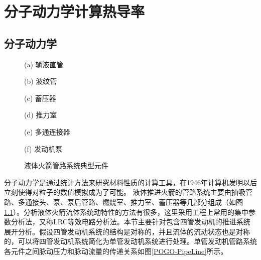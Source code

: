 
\chapter{分子动力学计算热导率}

\section{分子动力学}
\label{sec:Lumped-Feedline-Model}
\begin{figure}[!htb]
  \centering
  \begin{minipage}[b]{0.3\textwidth}
    \centering
    \caption*{(a) 输液直管}
  \end{minipage}
  \centering
  \begin{minipage}[b]{0.3\textwidth}
    \centering
    \caption*{(b) 波纹管}
  \end{minipage}
  \centering
  \begin{minipage}[b]{0.3\textwidth}
    \centering
    \caption*{(c) 蓄压器}
  \end{minipage}
  \centering
  \begin{minipage}[b]{0.3\textwidth}
    \centering
    \caption*{(d) 推力室}
  \end{minipage}
  \centering
  \begin{minipage}[b]{0.3\textwidth}
    \centering
    \caption*{(e) 多通连接器}
  \end{minipage}
  \centering
  \begin{minipage}[b]{0.3\textwidth}
    \centering
    \caption*{(f) 发动机泵}
  \end{minipage}
  \caption{液体火箭管路系统典型元件}
  \label{FeedLine-TypicalElement}
\end{figure}

分子动力学是通过统计方法来研究材料性质的计算工具，在1946年计算机发明以后立刻使得对粒子的数值模拟成为了可能。
液体推进火箭的管路系统主要由抽吸管路、多通接头、泵、泵后管路、燃烧室、推力室、蓄压器等几部分组成（如图\ref{FeedLine-TypicalElement}）。分析液体火箭流体系统动特性的方法有很多，这里采用工程上常用的集中参数分析法，又称LRC等效电路分析法\cite{Dimaggio:1972, Vaage:1972, YangMing:2010}。本节主要针对包含四管发动机的推进系统展开分析。假设四管发动机系统的结构是对称的，并且流体的流动状态也是对称的，可以将四管发动机系统简化为单管发动机系统进行处理。单管发动机管路系统各元件之间脉动压力和脉动流量的传递关系如图\ref{POGO-PipeLine}所示。

